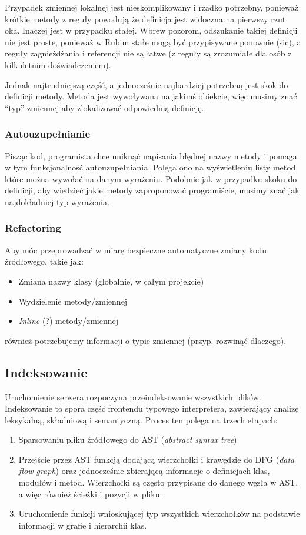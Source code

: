 \documentclass[declaration,shortabstract]{iithesis}
\begin{document}
Przypadek zmiennej lokalnej jest nieskomplikowany i rzadko potrzebny, ponieważ krótkie metody z reguły powodują że definicja jest widoczna na pierwszy rzut oka. Inaczej jest w przypadku stałej. Wbrew pozorom, odszukanie takiej definicji nie jest proste, ponieważ w Rubim stałe mogą być przypisywane ponownie (sic), a reguły zagnieżdżania i referencji nie są łatwe (z reguły są zrozumiałe dla osób z kilkuletnim doświadczeniem).

Jednak najtrudniejszą część, a jednocześnie najbardziej potrzebną jest skok do definicji metody. Metoda jest wywoływana na jakimś obiekcie, więc musimy znać ``typ'' zmiennej aby zlokalizować odpowiednią definicję.

\subsubsection{Autouzupełnianie}

Pisząc kod, programista chce uniknąć napisania błędnej nazwy metody i pomaga w tym funkcjonalność autouzupełniania. Polega ono na wyświetleniu listy metod które można wywołać na danym wyrażeniu. Podobnie jak w przypadku skoku do definicji, aby wiedzieć jakie metody zaproponować programiście, musimy znać jak najdokładniej typ wyrażenia.

\subsubsection{Refactoring}

Aby móc przeprowadzać w miarę bezpieczne automatyczne zmiany kodu źródłowego, takie jak:
\begin{itemize}
\item Zmiana nazwy klasy (globalnie, w całym projekcie)
\item Wydzielenie metody/zmiennej
\item \textit{Inline} (?) metody/zmiennej
\end{itemize}
również potrzebujemy informacji o typie zmiennej (przyp. rozwinąć dlaczego).

\subsection{Indeksowanie}

Uruchomienie serwera rozpoczyna przeindeksowanie wszystkich plików. Indeksowanie to spora część frontendu typowego interpretera, zawierający analizę leksykalną, składniową i semantyczną. Proces ten polega na trzech etapach:
\begin{enumerate}
\item Sparsowaniu pliku źródłowego do AST (\textit{abstract syntax tree})
\item Przejście przez AST funkcją dodającą wierzchołki i krawędzie do DFG (\textit{data flow graph}) oraz jednocześnie zbierającą informacje o definicjach klas, modułów i metod. Wierzchołki są często przypisane do danego węzła w AST, a więc również ścieżki i pozycji w pliku.
\item Uruchomienie funkcji wnioskującej typ wszystkich wierzchołków na podstawie informacji w grafie i hierarchii klas.
\end{enumerate}
\end{document}
